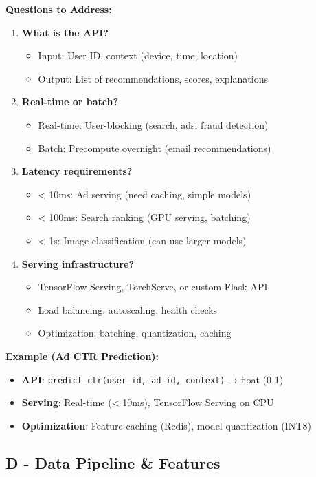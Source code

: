 \documentclass[10pt]{article}
\begin{document}
\textbf{Questions to Address:}
\begin{enumerate}
\item \textbf{What is the API?}
\begin{itemize}
\item Input: User ID, context (device, time, location)
\item Output: List of recommendations, scores, explanations
\end{itemize}

\item \textbf{Real-time or batch?}
\begin{itemize}
\item Real-time: User-blocking (search, ads, fraud detection)
\item Batch: Precompute overnight (email recommendations)
\end{itemize}

\item \textbf{Latency requirements?}
\begin{itemize}
\item < 10ms: Ad serving (need caching, simple models)
\item < 100ms: Search ranking (GPU serving, batching)
\item < 1s: Image classification (can use larger models)
\end{itemize}

\item \textbf{Serving infrastructure?}
\begin{itemize}
\item TensorFlow Serving, TorchServe, or custom Flask API
\item Load balancing, autoscaling, health checks
\item Optimization: batching, quantization, caching
\end{itemize}
\end{enumerate}

\textbf{Example (Ad CTR Prediction):}
\begin{itemize}
\item \textbf{API}: \texttt{predict\_ctr(user\_id, ad\_id, context)} → float (0-1)
\item \textbf{Serving}: Real-time (< 10ms), TensorFlow Serving on CPU
\item \textbf{Optimization}: Feature caching (Redis), model quantization (INT8)
\end{itemize}

\subsection{D - Data Pipeline \& Features}
\end{document}
